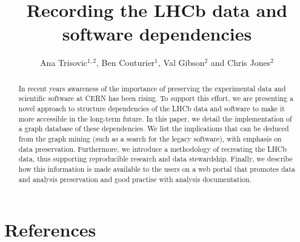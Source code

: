 \documentclass[a4paper]{jpconf}
\providecommand{\keywords}[1]{\qquad\textbf{Keywords---} #1}
\begin{document}
\title{Recording the LHCb data and software dependencies }


\author{Ana Trisovic$^{1,2}$, Ben Couturier$^1$, Val Gibson$^2$ and  Chris Jones$^2$  }
\address{$^1$ CERN, Geneva, Switzerland}
\address{$^2$ University of Cambridge, Cambridge, the United Kingdom}

\begin{abstract}In recent years awareness of the importance of preserving the experimental data and scientific software at CERN has been rising. To support this effort, we are presenting a novel approach to structure dependencies of the LHCb data and software to make it more accessible in the long-term future. In this paper, we detail the implementation of a graph database of these dependencies. We list the implications that can be deduced from the graph mining (such as a search for the legacy software), with emphasis on data preservation. Furthermore, we introduce a methodology of recreating the LHCb data, thus supporting reproducible research and data stewardship. Finally, we describe how this information is made available to the users on a web portal that promotes data and analysis preservation and good practise with analysis documentation.
\end{abstract}

{













\section*{References}


}
\end{document}
